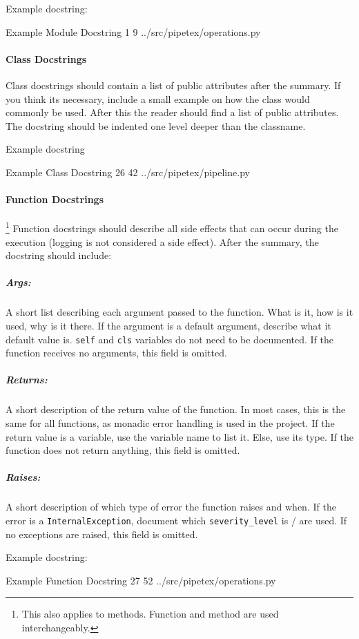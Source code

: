 Example docstring:

\codeexample
{Example Module Docstring}
{1}
{9}
{../src/pipetex/operations.py}

\paragraph{Class Docstrings} Class docstrings should contain a list of public
attributes after the summary. If you think its necessary, include a small 
example on how the class would commonly be used. After this the reader should
find a list of public attributes. The docstring should be indented one level
deeper than the classname.

Example docstring

\codeexample
{Example Class Docstring}
{26}
{42}
{../src/pipetex/pipeline.py}

\paragraph{Function Docstrings}\footnote{This also applies to methods. Function
and method are used interchangeably.} Function docstrings should describe all
side effects that can occur during the execution (logging is not considered a
side effect). After the summary, the docstring should include:

\subparagraph{Args:} A short list describing each argument passed to the
function.  What is it, how is it used, why is it there. If the argument is a
default argument, describe what it default value is. \verb|self| and \verb|cls|
variables do not need to be documented. If the function receives no arguments,
this field is omitted.

\subparagraph{Returns:} A short description of the return value of the
function.  In most cases, this is the same for all functions, as monadic error
handling is used in the project. If the return value is a variable, use the
variable name to list it. Else, use its type. If the function does not return
anything, this field is omitted.

\subparagraph{Raises:} A short description of which type of error the function
raises and when. If the error is a \verb|InternalException|, document which
\verb|severity_level| is / are used. If no exceptions are raised, this field is
omitted.

Example docstring:

\codeexample
{Example Function Docstring}
{27}
{52}
{../src/pipetex/operations.py}

